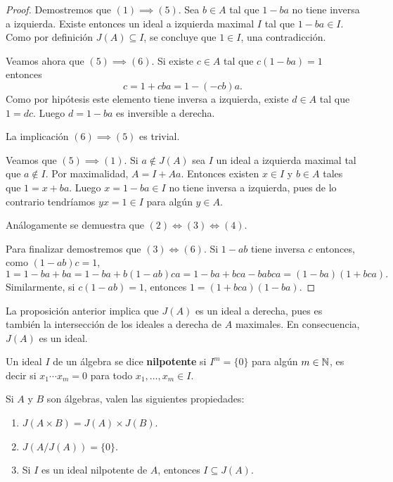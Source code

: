 \begin{proof}
	Demostremos que $(1)\implies(5)$. Sea $b\in A$ tal que $1-ba$ no tiene
	inversa a izquierda. Existe entonces un ideal a izquierda maximal $I$ tal
	que $1-ba\in I$. Como por definición $J(A)\subseteq I$, se
	concluye que $1\in I$, una contradicción.

	Veamos ahora que $(5)\implies (6)$. Si existe $c\in A$ tal que
	$c(1-ba)=1$ entonces 
	\[
	c=1+cba=1-(-cb)a.
	\]
	Como por hipótesis este elemento tiene
	inversa a izquierda, existe $d\in A$ tal que
	$1=dc$. Luego $d=1-ba$ es inversible a derecha. 
	
	La implicación $(6)\implies (5)$ es trivial. 
	
	Veamos que
	$(5)\implies(1)$. Si $a\not\in J(A)$ sea $I$ un ideal a izquierda maximal
	tal que $a\not\in I$. Por maximalidad, $A=I+Aa$. Entonces
	existen $x\in I$ y $b\in A$ tales que $1=x+ba$. Luego
	$x=1-ba\in I$ no tiene inversa a izquierda, pues de lo contrario
	tendríamos $yx=1\in I$ para algún $y\in A$. 

	Análogamente se demuestra que $(2)\Longleftrightarrow (3)\Longleftrightarrow (4)$.

	Para finalizar demostremos que $(3)\Longleftrightarrow (6)$. 
	Si $1-ab$ tiene inversa $c$ entonces, como $(1-ab)c=1$, 
	\[
	1=1-ba+ba=1-ba+b(1-ab)ca=1-ba+bca-babca=(1-ba)(1+bca).
	\]
	Similarmente, si $c(1-ab)=1$, entonces $1=(1+bca)(1-ba)$. 
\end{proof}

La proposición anterior implica que $J(A)$ es un ideal a derecha, pues es también 
la intersección de los ideales a derecha de $A$ maximales. En consecuencia,  
$J(A)$ es un ideal. 

\begin{definition}
Un ideal $I$ de un álgebra se dice \textbf{nilpotente} si $I^m=\{0\}$ para algún $m\in\mathbb{N}$, es decir
si $x_1\cdots x_m=0$ para todo $x_1,\dots,x_m\in I$.
\end{definition}

\begin{proposition} 
\label{pro:J_propiedades}
	Si $A$ y $B$ son álgebras, valen las siguientes propiedades: 
	\begin{enumerate}
	\item $J(A\times B)=J(A)\times J(B)$.
	\item $J(A/J(A))=\{0\}$.
	\item Si $I$ es un ideal nilpotente de $A$, entonces $I\subseteq J(A)$.
	\end{enumerate}
\end{proposition}

